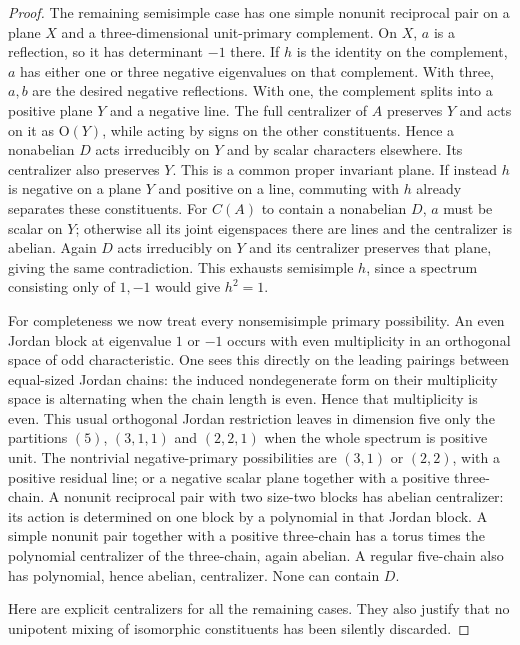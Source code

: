 \documentclass[11pt,a4paper]{article}
\begin{document}
\begin{proof}
The remaining semisimple case has one simple nonunit reciprocal pair
on a plane $X$ and a three-dimensional unit-primary complement.
On $X$, $a$ is a reflection, so it has determinant $-1$ there.
If $h$ is the identity on the complement, $a$ has either one or three
negative eigenvalues on that complement. With three, $a,b$ are the
desired negative reflections. With one, the complement splits into
a positive plane $Y$ and a negative line. The full centralizer of
$A$ preserves $Y$ and acts on it as $\mathrm O(Y)$, while acting by
signs on the other constituents. Hence a nonabelian $D$ acts
irreducibly on $Y$ and by scalar characters elsewhere. Its centralizer
also preserves $Y$. This is a common proper invariant plane.
If instead $h$ is negative on a plane $Y$ and positive on a line,
commuting with $h$ already separates these constituents. For $C(A)$
to contain a nonabelian $D$, $a$ must be scalar on $Y$; otherwise
all its joint eigenspaces there are lines and the centralizer is
abelian. Again $D$ acts irreducibly on $Y$ and its centralizer preserves
that plane, giving the same contradiction. This exhausts semisimple
$h$, since a spectrum consisting only of $1,-1$ would give $h^2=1$.

For completeness we now treat every nonsemisimple primary possibility.
An even Jordan block at eigenvalue $1$ or $-1$ occurs with even
multiplicity in an orthogonal space of odd characteristic. One sees
this directly on the leading pairings between equal-sized Jordan
chains: the induced nondegenerate form on their multiplicity space
is alternating when the chain length is even. Hence that multiplicity
is even. This usual orthogonal Jordan restriction leaves in dimension
five only the partitions $(5)$, $(3,1,1)$ and $(2,2,1)$ when the
whole spectrum is positive unit. The nontrivial negative-primary
possibilities are $(3,1)$ or $(2,2)$, with a positive residual line;
or a negative scalar plane together with a positive three-chain.
A nonunit reciprocal pair with two size-two blocks has abelian
centralizer: its action is determined on one block by a polynomial
in that Jordan block. A simple nonunit pair together with a positive
three-chain has a torus times the polynomial centralizer of the
three-chain, again abelian. A regular five-chain also has polynomial,
hence abelian, centralizer. None can contain $D$.

Here are explicit centralizers for all the remaining cases. They also
justify that no unipotent mixing of isomorphic constituents has been
silently discarded.


\end{proof}
\end{document}
